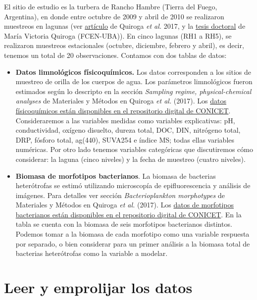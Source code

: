 \documentclass[
]{book}
\begin{document}
El sitio de estudio es la turbera de Rancho Hambre (Tierra del Fuego, Argentina), en donde entre octubre de 2009 y abril de 2010 se realizaron muestreos en lagunas (ver \href{https://link.springer.com/article/10.1007/s10750-016-2969-2}{artículo} de Quiroga \emph{et al.} 2017, y la \href{http://hdl.handle.net/20.500.12110/tesis_n5433_Quiroga}{tesis doctoral} de María Victoria Quiroga (FCEN-UBA)). En cinco lagunas (RH1 a RH5), se realizaron muestreos estacionales (octubre, diciembre, febrero y abril), es decir, tenemos un total de 20 observaciones. Contamos con dos tablas de datos:

\begin{itemize}
\item
  \textbf{Datos limnológicos físicoquímicos.} Los datos corresponden a los sitios de muestreo de orilla de los cuerpos de agua. Los parámetros limnológicos fueron estimados según lo descripto en la sección \emph{Sampling regime, physical-chemical analyses} de Materiales y Métodos en Quiroga \emph{et al.} (2017). Los \href{http://hdl.handle.net/11336/201874}{datos físicoquímicos están disponibles en el repositorio digital de CONICET}. Consideraremos a las variables medidas como variables explicativas: pH, conductividad, oxígeno disuelto, dureza total, DOC, DIN, nitrógeno total, DRP, fósforo total, ag(440), SUVA254 e índice MS; todas ellas variables numéricas. Por otro lado tenemos variables categóricas que discutiremos cómo considerar: la laguna (cinco niveles) y la fecha de muestreo (cuatro niveles).
\item
  \textbf{Biomasa de morfotipos bacterianos}. La biomasa de bacterias heterótrofas se estimó utilizando microscopía de epifluorescencia y análisis de imágenes. Para detalles ver sección \emph{Bacterioplankton morphotypes} de Materiales y Métodos en Quiroga \emph{et al.} (2017). Los \href{http://hdl.handle.net/11336/201811}{datos de morfotipos bacterianos están disponibles en el repositorio digital de CONICET}. En la tabla se cuenta con la biomasa de seis morfotipos bacterianos distintos. Podemos tomar a la biomasa de cada morfotipo como una variable respuesta por separado, o bien considerar para un primer análisis a la biomasa total de bacterias heterótrofas como la variable a modelar.
\end{itemize}

\hypertarget{leer-y-emprolijar-los-datos}{%
\section{Leer y emprolijar los datos}\label{leer-y-emprolijar-los-datos}}
\end{document}
